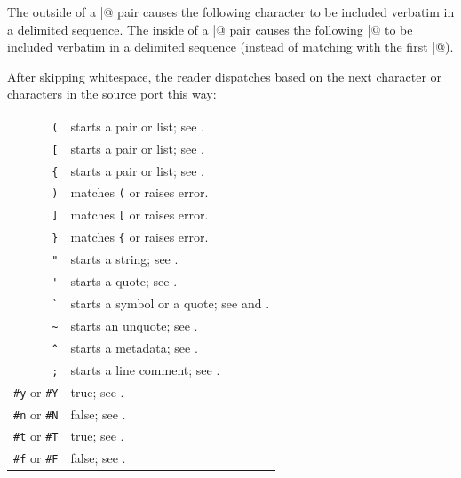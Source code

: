The \lstinline@\@ outside of a \lstinline@|@ pair causes the following character to be included verbatim in a delimited sequence. The \lstinline@\@ inside of a \lstinline@|@ pair causes the following \lstinline@|@ to be included verbatim in a delimited sequence (instead of matching with the first \lstinline@|@). 

After skipping whitespace, the \AmlBase reader dispatches based on the next character or characters in the source port this way:

\begin{table}
\begin{longtable}{ r l }
  \lstinline!(! & starts a pair or list; see \nameref{subsec:aml-base-lang-reader-lists}. \\
  \lstinline![! & starts a pair or list; see \nameref{subsec:aml-base-lang-reader-lists}. \\
  \lstinline!{! & starts a pair or list; see \nameref{subsec:aml-base-lang-reader-lists}. \\
  \lstinline!)! & matches \lstinline!(! or raises error. \\
  \lstinline!]! & matches \lstinline![! or raises error. \\
  \lstinline!}! & matches \lstinline!{! or raises error. \\
  
\pagebreak[2]
  \lstinline!"! & starts a string; see \nameref{subsec:aml-base-lang-reader-strings}. \\
  \lstinline!'! & starts a quote; see \nameref{subsec:aml-base-lang-reader-quotes}. \\
  \lstinline!`! & starts a symbol or a quote; see \nameref{subsec:aml-base-lang-reader-symbols} and \nameref{subsec:aml-base-lang-reader-quotes}. \\
  \lstinline!~! & starts an unquote; see \nameref{subsec:aml-base-lang-reader-quotes}. \\
  \lstinline!^! & starts a metadata; see \nameref{subsec:aml-base-lang-reader-metadata}. \\
  \lstinline!;! & starts a line comment; see \nameref{subsec:aml-base-lang-reader-comments}. \\
  
\pagebreak[2]
  \lstinline!#y! or \lstinline!#Y! & true; see \nameref{subsec:aml-base-lang-reader-booleans}. \\
  \lstinline!#n! or \lstinline!#N! & false; see \nameref{subsec:aml-base-lang-reader-booleans}. \\
  \lstinline!#t! or \lstinline!#T! & true; see \nameref{subsec:aml-base-lang-reader-booleans}. \\
  \lstinline!#f! or \lstinline!#F! & false; see \nameref{subsec:aml-base-lang-reader-booleans}. \\  
  

\end{longtable}
\end{table}
